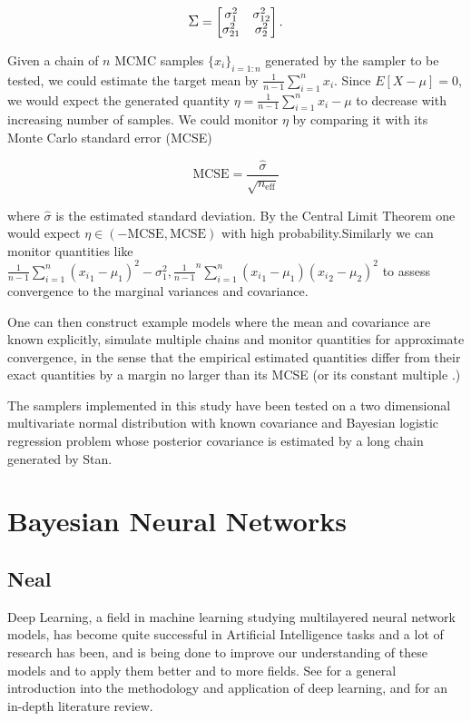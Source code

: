 \documentclass[12pt]{report}
\begin{document}
\begin{displaymath}
\mathlarger{\Sigma} = 
\begin{bmatrix}
\sigma^2_1 &\sigma_{12}^2 \\
\sigma_{21}^2 &\sigma^2_2 \\
\end{bmatrix}.
\end{displaymath}

Given a chain of $n$ MCMC samples $\{x_i\}_{i=1:n}$ generated by the sampler to be tested, we could estimate  the target mean by $ \frac{1}{n-1} \sum_{i=1}^ n x_i$. Since $E[X-\mu] = 0$, we would expect the generated quantity $\eta= \frac{1}{n-1} \sum_{i=1}^ n x_i -\mu$ to decrease with increasing number of samples. We could monitor $\eta$ by comparing it with its Monte Carlo standard error (MCSE) 

\[ \text{MCSE} = \frac{\hat{\sigma}}{\sqrt{n_{\text{eff}}}} \]

where $\hat{\sigma}$ is the estimated standard deviation. By the Central Limit Theorem one would expect  $\eta \in (-\text{MCSE},\text{MCSE})$ with high probability.Similarly we can monitor quantities like $\frac{1}{n-1} \sum_{i=1}^n ({x_i}_1 -\mu_1)^2 - \sigma^2_1,  \frac{1}{n-1}^n \sum_{i=1}^n ({x_i}_1 - \mu_1)({x_i}_2 - \mu_2)^2 $ to assess convergence to the marginal variances and covariance.

One can then construct example models where the mean and covariance are known explicitly, simulate multiple chains and monitor quantities for approximate convergence, in the sense that the empirical estimated quantities differ from their exact quantities by a margin no larger than its MCSE (or its constant multiple .) 

The samplers implemented in this study have been tested on a two dimensional multivariate normal distribution with known covariance and Bayesian logistic regression problem whose posterior covariance is estimated by a long chain generated by Stan.

\chapter{Bayesian Neural Networks}
\section{Neal}

Deep Learning, a field in machine learning studying multilayered neural network models, has become quite successful in Artificial Intelligence tasks and a lot of research has been, and is being done to improve our understanding of these models and to apply them better and to more fields. See \cite{Goodfellow-et-al-2016-Book,lecun2015deep} for a general introduction into the methodology and application of deep learning, and \cite{schmidhuber2015deep} for an in-depth literature review. 
\end{document}
